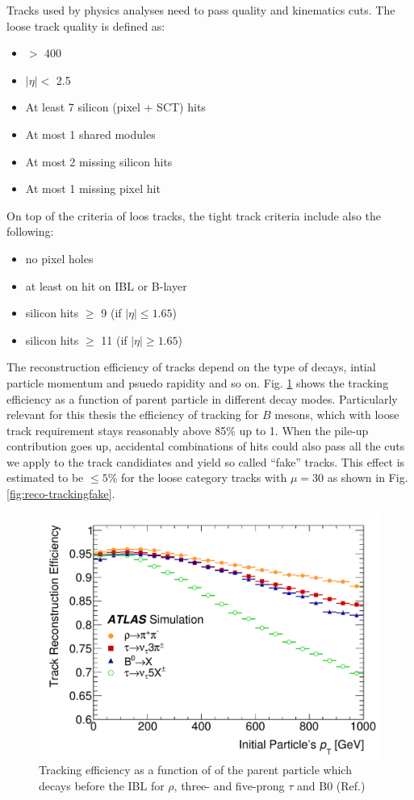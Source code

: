 Tracks used by physics analyses need to pass quality and kinematics cuts. The loose track quality is defined as:

\begin{itemize}
\item \pT $>$ 400 \mev
\item $|\eta| < $ 2.5
\item At least 7 silicon (pixel + SCT) hits
\item At most 1 shared modules
\item At most 2 missing silicon hits
\item At most 1 missing pixel hit
\end{itemize}

On top of the criteria of loos tracks, the tight track criteria include also the following:

\begin{itemize}
\item no pixel holes
\item at least on hit on IBL or B-layer
\item silicon hits $\geq$ 9 (if $|\eta|\leq 1.65$)
\item silicon hits $\geq$ 11 (if $|\eta|\geq 1.65$)
\end{itemize}

The reconstruction efficiency of tracks depend on the type of decays, intial particle momentum and psuedo rapidity and so on. Fig. \ref{fig:reco-trackingeff} shows the tracking efficiency as a function of parent particle \pt in different decay modes. Particularly relevant for this thesis the efficiency of tracking for $B$ mesons, which with loose track requirement stays reasonably above 85\% up to 1\TeV. When the pile-up contribution goes up, accidental combinations of hits could also pass all the cuts we apply to the track candidiates and yield so called ``fake'' tracks. This effect is estimated to be $\leq 5\%$ for the loose category tracks with $\mu = 30$ as shown in Fig.\ref{fig:reco-trackingfake}.


\begin{figure}[htpb!]
\begin{center}
  \includegraphics[width=0.55\linewidth]{figures/Reco/TrackingEfficiency}
  \caption{Tracking efficiency as a function of \pt of the parent particle which decays before the IBL for $\rho$, three- and five-prong $\tau$ and B0 (Ref.\cite{PERF-2015-08})}
\label{fig:reco-trackingeff}
\end{center}
\end{figure}

